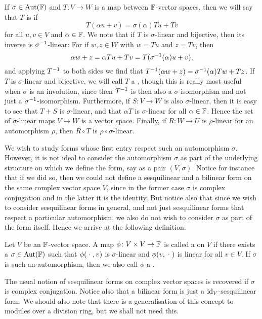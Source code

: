 If $\sigma \in \mathrm{Aut}(\mathbb{F})$ and $T \colon V \to W$ is a map between $\mathbb{F}$-vector spaces, then we will say that $T$ is  if
%
\begin{equation*}
    T(\alpha u + v)
        = \sigma(\alpha) Tu + Tv
\end{equation*}
%
for all $u,v \in V$ and $\alpha \in \mathbb{F}$. We note that if $T$ is $\sigma$-linear and bijective, then its inverse is $\sigma^{-1}$-linear: For if $w,z \in W$ with $w = Tu$ and $z = Tv$, then
%
\begin{equation*}
    \alpha w + z
        = \alpha Tu + Tv
        = T(\sigma^{-1}(\alpha)u + v),
\end{equation*}
%
and applying $T^{-1}$ to both sides we find that $T^{-1}(\alpha w + z) = \sigma^{-1}(\alpha)Tw + Tz$. If $T$ is $\sigma$-linear and bijective, we will call $T$ a , though this is really most useful when $\sigma$ is an involution, since then $T^{-1}$ is then also a $\sigma$-isomorphism and not just a $\sigma^{-1}$-isomorphism. Furthermore, if $S \colon V \to W$ is also $\sigma$-linear, then it is easy to see that $T + S$ is $\sigma$-linear, and that $\alpha T$ is $\sigma$-linear for all $\alpha \in \mathbb{F}$. Hence the set of $\sigma$-linear maps $V \to W$ is a vector space. Finally, if $R \colon W \to U$ is $\rho$-linear for an automorphism $\rho$, then $R \circ T$ is $\rho \circ \sigma$-linear.


We wish to study forms whose first entry respect such an automorphism $\sigma$. However, it is not ideal to consider the automorphism $\sigma$ as part of the underlying structure on which we define the form, say as a pair $(V,\sigma)$. Notice for instance that if we did so, then we could not define a sesquilinear and a bilinear form on the same complex vector space $V$, since in the former case $\sigma$ is complex conjugation and in the latter it is the identity. But notice also that since we wish to consider sesquilinear forms in general, and not just sesquilinear forms that respect a particular automorphism, we also do not wish to consider $\sigma$ as part of the form itself. Hence we arrive at the following definition:

\begin{definition}
    Let $V$ be an $\mathbb{F}$-vector space. A map $\phi \colon V \prod V \to \fieldF$ is called a  on $V$ if there exists a $\sigma \in \mathrm{Aut}(\mathbb{F})$ such that $\phi(\blank,v)$ is $\sigma$-linear and $\phi(v,\blank)$ is linear for all $v \in V$. If $\sigma$ is such an automorphism, then we also call $\phi$ a .
\end{definition}
%
The usual notion of sesquilinear forms on complex vector spaces is recovered if $\sigma$ is complex conjugation. Notice also that a bilinear form is just a $\operatorname{id}_V$-sesquilinear form. We should also note that there is a generalisation of this concept to modules over a division ring, but we shall not need this.

